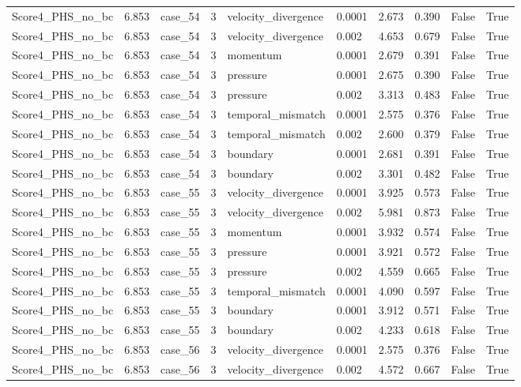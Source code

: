 \begin{longtable}{llllllllll}
Score4\_PHS\_no\_bc & 6.853 & case\_54 & 3 & velocity\_divergence & 0.0001 & 2.673 & 0.390 & False & True \\
Score4\_PHS\_no\_bc & 6.853 & case\_54 & 3 & velocity\_divergence & 0.002 & 4.653 & 0.679 & False & True \\
Score4\_PHS\_no\_bc & 6.853 & case\_54 & 3 & momentum & 0.0001 & 2.679 & 0.391 & False & True \\
Score4\_PHS\_no\_bc & 6.853 & case\_54 & 3 & pressure & 0.0001 & 2.675 & 0.390 & False & True \\
Score4\_PHS\_no\_bc & 6.853 & case\_54 & 3 & pressure & 0.002 & 3.313 & 0.483 & False & True \\
Score4\_PHS\_no\_bc & 6.853 & case\_54 & 3 & temporal\_mismatch & 0.0001 & 2.575 & 0.376 & False & True \\
Score4\_PHS\_no\_bc & 6.853 & case\_54 & 3 & temporal\_mismatch & 0.002 & 2.600 & 0.379 & False & True \\
Score4\_PHS\_no\_bc & 6.853 & case\_54 & 3 & boundary & 0.0001 & 2.681 & 0.391 & False & True \\
Score4\_PHS\_no\_bc & 6.853 & case\_54 & 3 & boundary & 0.002 & 3.301 & 0.482 & False & True \\
Score4\_PHS\_no\_bc & 6.853 & case\_55 & 3 & velocity\_divergence & 0.0001 & 3.925 & 0.573 & False & True \\
Score4\_PHS\_no\_bc & 6.853 & case\_55 & 3 & velocity\_divergence & 0.002 & 5.981 & 0.873 & False & True \\
Score4\_PHS\_no\_bc & 6.853 & case\_55 & 3 & momentum & 0.0001 & 3.932 & 0.574 & False & True \\
Score4\_PHS\_no\_bc & 6.853 & case\_55 & 3 & pressure & 0.0001 & 3.921 & 0.572 & False & True \\
Score4\_PHS\_no\_bc & 6.853 & case\_55 & 3 & pressure & 0.002 & 4.559 & 0.665 & False & True \\
Score4\_PHS\_no\_bc & 6.853 & case\_55 & 3 & temporal\_mismatch & 0.0001 & 4.090 & 0.597 & False & True \\
Score4\_PHS\_no\_bc & 6.853 & case\_55 & 3 & boundary & 0.0001 & 3.912 & 0.571 & False & True \\
Score4\_PHS\_no\_bc & 6.853 & case\_55 & 3 & boundary & 0.002 & 4.233 & 0.618 & False & True \\
Score4\_PHS\_no\_bc & 6.853 & case\_56 & 3 & velocity\_divergence & 0.0001 & 2.575 & 0.376 & False & True \\
Score4\_PHS\_no\_bc & 6.853 & case\_56 & 3 & velocity\_divergence & 0.002 & 4.572 & 0.667 & False & True \\

\end{longtable}
